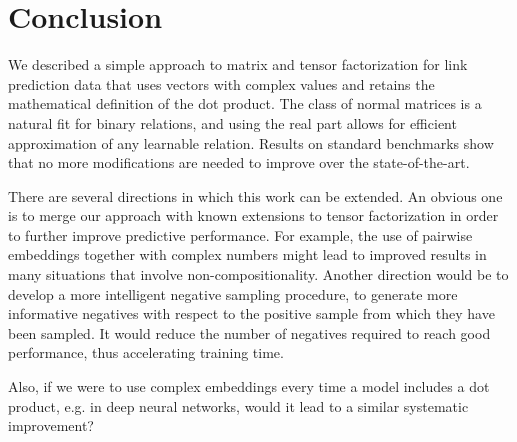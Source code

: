 \documentclass{article}
\begin{document}







\section{Conclusion}

We described a simple approach to matrix and tensor factorization for link prediction data that uses vectors with complex values and retains the mathematical definition of the dot product. 
The class of normal matrices is a natural fit for binary relations, and using the real part allows for efficient approximation of any learnable relation. Results on standard benchmarks show that no more modifications are needed to improve over the state-of-the-art. 



There are several directions in which this work can be extended. An obvious one is to merge our approach with known extensions to tensor factorization in order to further improve predictive performance. For example, the use of pairwise embeddings together with complex numbers might lead to improved results in many situations that involve non-compositionality. %
Another direction would be to develop a more intelligent negative sampling procedure, to generate more informative negatives with respect to the positive sample from which they have been sampled. It would reduce the number of negatives required to reach good performance, thus accelerating training time.

Also, if we were to use complex embeddings every time a model includes a dot product, e.g. in deep neural networks, would it lead to a similar systematic improvement? 

\end{document}
